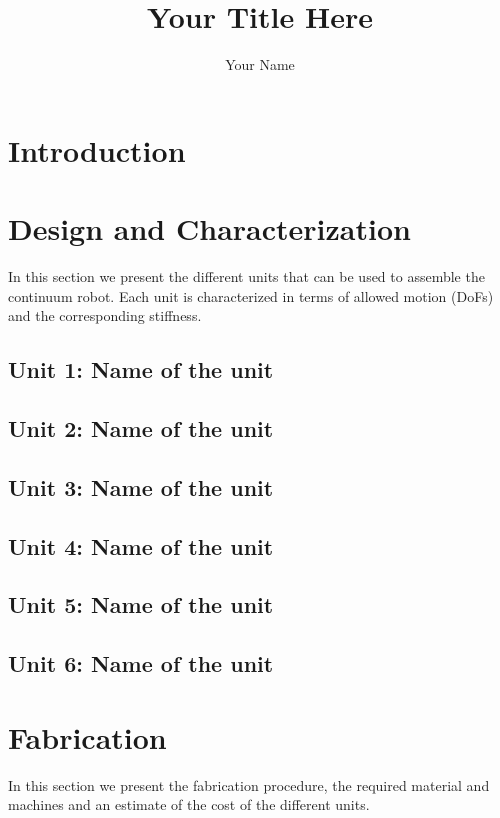 \documentclass[12pt]{article}
\begin{document}
\title{Your Title Here}
\author{Your Name}

\maketitle
\begin{abstract}

\end{abstract}



\section{Introduction}



\section{Design and Characterization}
In this section we present the different units that can be used to assemble the continuum robot. 
Each unit is characterized in terms of allowed motion (DoFs) and the corresponding stiffness.

\subsection{Unit 1: Name of the unit}
\subsection{Unit 2: Name of the unit}
\subsection{Unit 3: Name of the unit}
\subsection{Unit 4: Name of the unit}
\subsection{Unit 5: Name of the unit}
\subsection{Unit 6: Name of the unit}



\section{Fabrication}
In this section we present the fabrication procedure, the required material and machines and an estimate of the cost of the different units.
\end{document}
